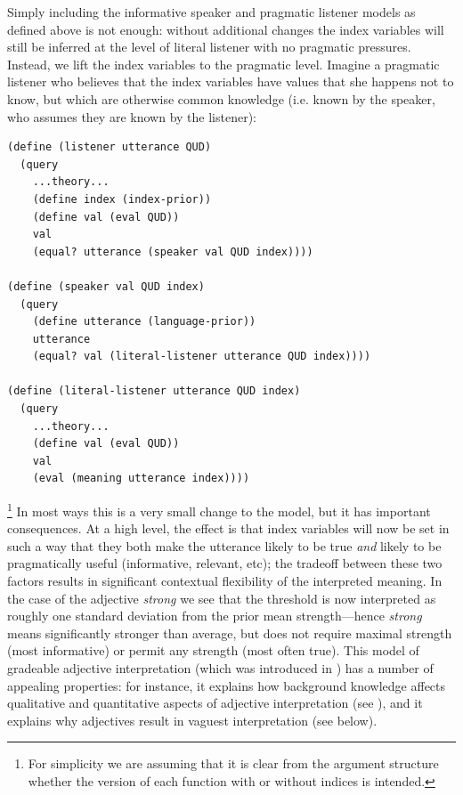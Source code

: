 \documentclass[12pt]{article}
\begin{document}
Simply including the informative speaker and pragmatic listener models as defined above is not enough: without additional changes the index variables will still be inferred at the level of literal listener with no pragmatic pressures.  Instead, we lift the index variables to the pragmatic level. Imagine a pragmatic listener who believes that the index variables have values that she happens not to know, but which are otherwise common knowledge (i.e. known by the speaker, who assumes they are known by the listener):
\begin{lstlisting}
(define (listener utterance QUD)
  (query
    ...theory...
    (define index (index-prior))
    (define val (eval QUD))
    val
    (equal? utterance (speaker val QUD index))))
    
(define (speaker val QUD index)
  (query
    (define utterance (language-prior))
    utterance
    (equal? val (literal-listener utterance QUD index))))

(define (literal-listener utterance QUD index)
  (query
    ...theory...
    (define val (eval QUD))
    val
    (eval (meaning utterance index))))
\end{lstlisting}\footnote{For simplicity we are assuming that it is clear from the argument structure whether the version of each function with or without indices is intended.}
In most ways this is a very small change to the model, but it has important consequences. At a high level, the effect is that index variables will now be set in such a way that they both make the utterance likely to be true \emph{and} likely to be pragmatically useful (informative, relevant, etc); the tradeoff between these two factors results in significant contextual flexibility of the interpreted meaning. In the case of the adjective \emph{strong} we see  that the threshold is now interpreted as roughly one standard deviation from the prior mean strength---hence \emph{strong} means significantly stronger than average, but does not require maximal strength (most informative) or permit any strength (most often true). This model of gradeable adjective interpretation (which was introduced in \cite{Lassiter2013}) has a number of appealing properties: for instance, it explains how background knowledge affects qualitative and quantitative aspects of adjective interpretation (see \cite{Lassiter2013}), and it explains why adjectives result in vaguest interpretation (see below).
\end{document}
